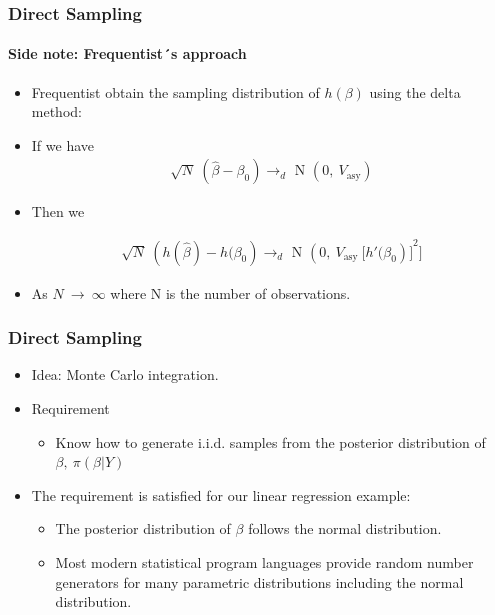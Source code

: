 \documentclass[
  shownotes,
  xcolor={svgnames},
  hyperref={colorlinks,citecolor=DarkBlue,linkcolor=DarkRed,urlcolor=DarkBlue}
  , aspectratio=169]{beamer}
\begin{document}
\begin{frame}[fragile]
\frametitle{Direct Sampling}
\framesubtitle{Side note: Frequentist´s approach}

\begin{itemize}
\item Frequentist obtain the sampling distribution of $h\left( \beta \right)$ using the delta method:
\medskip
\item If we have
\medskip
\begin{align}
\sqrt{N}\ \left( \widehat{\beta} - \beta_{0} \right) \rightarrow_{d}\text{\ N\ }\left( 0,\ V_{\text{asy}} \right)
\end{align}

\medskip
\item  Then we

\begin{align}
\sqrt{N}\ \left( h\left( \widehat{\beta} \right) - h(\beta_{0} \right) \rightarrow_{d}\text{\ N\ }{\left( 0,\ V_{\text{asy}}\ \lbrack h'(\beta_{0} \right)\rbrack}^{2}]
\end{align}

\item As $N\  \rightarrow \ \infty$ where N is the number of observations.
\end{itemize}
\end{frame}
\begin{frame}[fragile]
\frametitle{Direct Sampling}

\begin{itemize}

\item Idea: Monte Carlo integration.
\medskip
\item Requirement
\medskip
    \begin{itemize}
        \item Know how to generate $\text{i.i.d.}$ samples from the posterior distribution of $\beta,\ \pi(\beta|Y)$
    \end{itemize}
    \medskip
    \item The requirement is satisfied for our linear regression example:
    \medskip
    \begin{itemize}
        \item The posterior distribution of $\beta$ follows the normal distribution.
    \medskip
        \item Most modern statistical program languages provide random number generators for many parametric distributions including the normal distribution.
    \end{itemize}
\end{itemize}

\end{frame}
\end{document}
